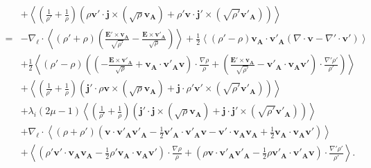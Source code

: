 \begin{equation}
\begin{array}{rl}
        &+ \left<\left(\frac{1}{\rho'}+ \frac{1}{\rho}\right)\left( \rho  \boldsymbol{v'} \cdot  \boldsymbol{j}  \times \left( \sqrt{\rho}\boldsymbol{v_A}\right) + \rho' \boldsymbol{v} \cdot  \boldsymbol{j'}\times \left( \sqrt{\rho'}\boldsymbol{v'_A}\right)\right)\right> \\%
        \label{eq:turb_bi_EL8-11B}=&- \nabla_{\boldsymbol{\ell}} \cdot \left< \left(\rho' + \rho\right) \left(\frac{ \boldsymbol{E'}\times \boldsymbol{v_A} }{\sqrt{\rho'}} - \frac{ \boldsymbol{E}\times \boldsymbol{v'_A} }{\sqrt{\rho}}\right)\right> +  \frac{1}{2}\left<\left(\rho' - \rho\right) \boldsymbol{v_A} \cdot \boldsymbol{v'_{A}} \left(  \nabla \cdot \boldsymbol{v}-  \nabla' \cdot \boldsymbol{v'}\right)\right> \\ %
  &+\frac{1}{2} \left<\left(\rho' - \rho\right) \left(\left(-\frac{ \boldsymbol{E}\times \boldsymbol{v'_A} }{\sqrt{\rho}} + \boldsymbol{v_A} \cdot \boldsymbol{v'_{A}} \boldsymbol{v}\right) \cdot \frac{\nabla  \rho }{\rho}+\left(\frac{ \boldsymbol{E'}\times \boldsymbol{v_A} }{\sqrt{\rho'}} - \boldsymbol{v'_A} \cdot \boldsymbol{v_{A}} \boldsymbol{v'}\right) \cdot \frac{\nabla'  \rho' }{\rho'}\right)\right> \\%
        &+ \left<\left(\frac{1}{\rho'}+ \frac{1}{\rho}\right)\left(  \boldsymbol{j'} \cdot   \rho\boldsymbol{v}  \times \left( \sqrt{\rho}\boldsymbol{v_A}\right) 
        +  \boldsymbol{j} \cdot \rho' \boldsymbol{v'}\times \left( \sqrt{\rho'}\boldsymbol{v'_A}\right)
        \right)\right> \\%
        &+ \lambda_i\left(2\mu-1\right) \left<\left(\frac{1}{\rho'}+ \frac{1}{\rho}\right)\left( \boldsymbol{j'} \cdot \boldsymbol{j} \times \left( \sqrt{\rho}\boldsymbol{v_A}\right) + \boldsymbol{j} \cdot  \boldsymbol{j'} \times \left( \sqrt{\rho'}\boldsymbol{v'_A}\right)\right)\right> \\%
&+\nabla_{\boldsymbol{\ell}} \cdot  \left<( \rho + \rho' )( \boldsymbol{v} \cdot  \boldsymbol{v'_A}  \boldsymbol{v'_A} - \frac{1}{2} \boldsymbol{v'_A} \cdot \boldsymbol{v'_A} \boldsymbol{v} - \boldsymbol{v'} \cdot  \boldsymbol{v_A}  \boldsymbol{v_A} + \frac{1}{2} \boldsymbol{v_A} \cdot \boldsymbol{v_A} \boldsymbol{v'})\right> \\%
         &+ \left<( \rho'  \boldsymbol{v'} \cdot  \boldsymbol{v_A}  \boldsymbol{v_A} - \frac{1}{2}\rho' \boldsymbol{v_A} \cdot \boldsymbol{v_A} \boldsymbol{v'})\cdot  \frac{\nabla\rho}{\rho} 
         +(  \rho \boldsymbol{v} \cdot  \boldsymbol{v'_A}  \boldsymbol{v'_A} - \frac{1}{2} \rho \boldsymbol{v'_A} \cdot \boldsymbol{v'_A} \boldsymbol{v})\cdot \frac{\nabla'\rho'}{\rho'}     \right> .
\end{array} \end{equation}
